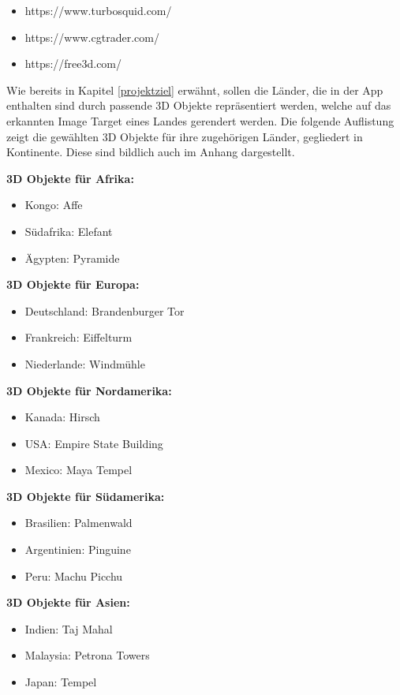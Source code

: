 \begin{itemize}
\item https://www.turbosquid.com/
\item https://www.cgtrader.com/
\item https://free3d.com/
\end{itemize}

Wie bereits in Kapitel \ref{projektziel} erwähnt, sollen die Länder, die in der App enthalten sind durch passende 3D Objekte repräsentiert werden, welche auf das erkannten Image Target eines Landes gerendert werden. 
Die folgende Auflistung zeigt die gewählten 3D Objekte für ihre zugehörigen Länder, gegliedert in Kontinente. Diese sind bildlich auch im Anhang dargestellt.

\textbf{3D Objekte für Afrika:}
\begin{itemize}
\item Kongo: Affe
\item Südafrika: Elefant
\item Ägypten: Pyramide
\end{itemize}

\textbf{3D Objekte für Europa:}
\begin{itemize}
\item Deutschland: Brandenburger Tor	
\item Frankreich: Eiffelturm
\item Niederlande: Windmühle
\end{itemize}

\textbf{3D Objekte für Nordamerika:}
\begin{itemize}
\item Kanada: Hirsch
\item USA: Empire State Building
\item Mexico: Maya Tempel
\end{itemize}

\textbf{3D Objekte für Südamerika:}
\begin{itemize}
\item Brasilien: Palmenwald
\item Argentinien: Pinguine
\item Peru: Machu Picchu
\end{itemize}

\textbf{3D Objekte für Asien:}
\begin{itemize}
\item Indien: Taj Mahal
\item Malaysia: Petrona Towers
\item Japan: Tempel
\end{itemize}

